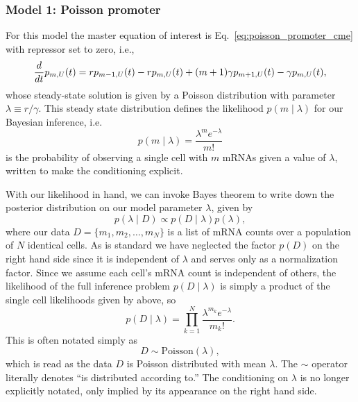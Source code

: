 \subsubsection{Model 1: Poisson promoter}
For this model the master equation of interest is
Eq.~\ref{eq:poisson_promoter_cme} with repressor set to zero, i.e.,
\begin{equation}
\frac{d {}}{d t}p_{m,U}(t) = rp_{m-1,U}(t) - rp_{m,U}(t)
        + (m+1)\gamma p_{m+1,U}(t) - \gamma p_{m,U}(t),
\end{equation}
whose steady-state solution is given by a Poisson distribution with parameter
$\lambda \equiv r / \gamma$. This steady state distribution defines the
likelihood $p(m\mid\lambda)$ for our Bayesian inference, i.e. 
\begin{equation}
p(m\mid\lambda) = \frac{\lambda^m e^{-\lambda}}{m!}
\label{eq:poisson_inference010}
\end{equation}
is the probability of observing a single cell with $m$ mRNAs given a value of
$\lambda$, written to make the conditioning explicit.

With our likelihood in hand, we can invoke Bayes theorem to write down the
posterior distribution on our model parameter $\lambda$, given by
\begin{equation}
p(\lambda\mid D) \propto p(D\mid\lambda) p(\lambda),
\end{equation}
where our data $D=\{m_1, m_2,\dots, m_N\}$ is a list of mRNA counts over a
population of $N$ identical cells. As is standard we have neglected the factor
$p(D)$ on the right hand side since it is independent of $\lambda$ and serves
only as a normalization factor. Since we assume each cell's mRNA count is
independent of others, the likelihood of the full inference problem
$p(D\mid\lambda)$ is simply a product of the single cell likelihoods given by
 above, so
\begin{equation}
p(D\mid\lambda) = \prod_{k=1}^N \frac{\lambda^{m_k}e^{-\lambda}}{m_k!}.
\end{equation}
This is often notated simply as
\begin{equation}
D \sim \text{Poisson}(\lambda),
\end{equation}
which is read as the data $D$ is Poisson distributed with mean $\lambda$. The
$\sim$ operator literally denotes ``is distributed according to.'' The
conditioning on $\lambda$ is no longer explicitly notated, only implied by its
appearance on the right hand side.

